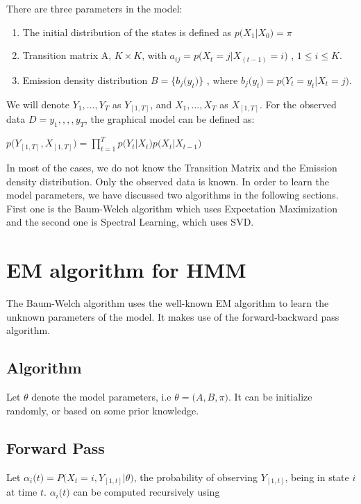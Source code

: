 \documentclass{article} %
\begin{document}
There are three parameters in the model:
\begin{enumerate}
\item The initial distribution of the states is defined as \(p\big(X_1|X_0 \big) = \pi\)
\item Transition matrix A, \(K \times K \), with \(a_{ij} = p\big(X_t=j|X_(t-1)=i\big)\) , \(1\leq i \leq K \).
\item Emission density distribution \(B = \{b_{j}\big(y_t\big)\}\) , where \(b_{j}\big(y_t\big) = p\big(Y_t=y_t|X_t=j\big)\).
\end{enumerate}

We will denote \(Y_1,...,Y_T\) as \(Y_{[1,T]}\), and \(X_1,...,X_T\) as \(X_{[1,T]}\). For the observed data \(D ={y_1,,,,y_T}\), the graphical model can be defined as:

\begin{center} \(  p\big( Y_{[1,T]}, X_{[1,T]} \big) = \prod_{t=1}^{T}p\big(Y_t|X_t\big)p\big(X_t|X_{t-1}\big)  \)
\end{center}

In most of the cases, we do not know the Transition Matrix and the Emission density distribution. Only
the observed data is known. In order to learn the model parameters, we have discussed two algorithms in the following sections. First one is the Baum-Welch algorithm which uses Expectation Maximization and the second one is Spectral Learning, which uses SVD.

\section{EM algorithm for HMM}
\label{EM algorithm}
The Baum-Welch algorithm uses the well-known EM algorithm to learn the unknown parameters of the model. It makes use of the forward-backward pass algorithm. 

\subsection*{Algorithm}
Let $\theta$ denote the model parameters, i.e \( \theta = \big(A,B,\pi\big) \). It can be initialize randomly, or based on some prior knowledge.

\subsection*{Forward Pass}
Let $\alpha_i\big(t\big) = P\big(X_t=i,Y_{[1,t]}|\theta\big)$, the probability of observing  $Y_{[1,t]}$, being in state $i$ at time $t$. $\alpha_i\big(t\big)$ can be computed recursively using
\end{document}

